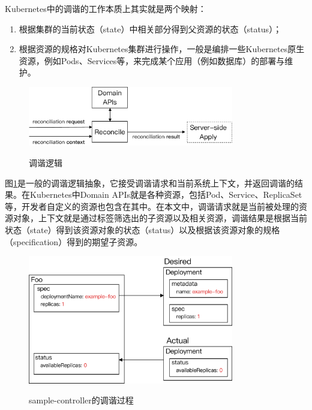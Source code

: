 \documentclass[macfonts,master]{njuthesis}
\begin{document}
Kubernetes中的调谐的工作本质上其实就是两个映射：
\begin{enumerate}
	\item 根据集群的当前状态（state）中相关部分得到父资源的状态（status）；
	\item 根据资源的规格对Kubernetes集群进行操作，一般是编排一些Kubernetes原生资源，例如Pods、Services等，来完成某个应用（例如数据库）的部署与维护。
\end{enumerate}

\begin{figure}[htbp]
  \centering
  \includegraphics[width= 0.8\textwidth]{pics/reconciler-interface.pdf}\\
  \caption{调谐逻辑}\label{fig:reconciler}
\end{figure}

图\ref{fig:reconciler}是一般的调谐逻辑抽象，它接受调谐请求和当前系统上下文，并返回调谐的结果。在Kubernetes中Domain APIs就是各种资源，包括Pod、Service、ReplicaSet等，开发者自定义的资源也包含在其中。在本文中，调谐请求就是当前被处理的资源对象，上下文就是通过标签筛选出的子资源以及相关资源，调谐结果是根据当前状态（state）得到该资源对象的状态（status）以及根据该资源对象的规格（specification）得到的期望子资源。

\begin{figure}[htbp]
  \centering
  \includegraphics[width=0.8\textwidth]{pics/Foo-reconciliation.pdf}\\
  \caption{sample-controller的调谐过程}\label{fig:Foo-reconciliation}
\end{figure}
\end{document}
